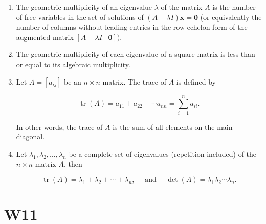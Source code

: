 \documentclass[10pt]{article}
\begin{document}
\begin{enumerate}
\item The geometric multiplicity of an eigenvalue $\lambda$ of the matrix $A$ is the number of free variables in the set of solutions of $(A-\lambda I) \mathbf{x}=\mathbf{0}$ (or equivalently the number of columns without leading entries in the row echelon form of the augmented matrix $[A-\lambda I \mid \mathbf{0}])$.

\item The geometric multiplicity of each eigenvalue of a square matrix is less than or equal to its algebraic multiplicity.

\item Let $A=\left[a_{i j}\right]$ be an $n \times n$ matrix. The trace of $A$ is defined by

$$
\operatorname{tr}(A)=a_{11}+a_{22}+\cdots a_{n n}=\sum_{i=1}^{n} a_{i i} .
$$

In other words, the trace of $A$ is the sum of all elements on the main diagonal.

\item Let $\lambda_{1}, \lambda_{2}, \ldots, \lambda_{n}$ be a complete set of eigenvalues (repetition included) of the $n \times n$ matrix $A$, then

$$
\operatorname{tr}(A)=\lambda_{1}+\lambda_{2}+\cdots+\lambda_{n}, \quad \text { and } \quad \operatorname{det}(A)=\lambda_{1} \lambda_{2} \cdots \lambda_{n} .
$$






\end{enumerate}


\newpage

\section{W11}
\end{document}
